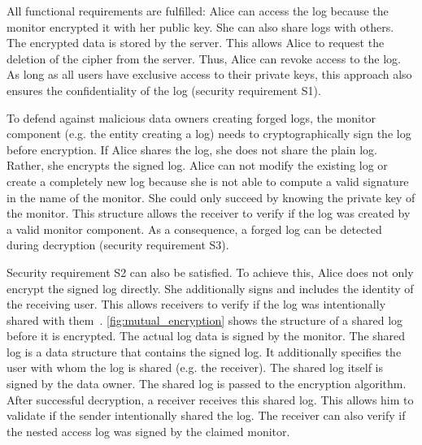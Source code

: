 \documentclass[../main.tex]{subfiles}
\begin{document}
All functional requirements are fulfilled:
Alice can access the log because the monitor encrypted it with her public key.
She can also share logs with others.
The encrypted data is stored by the server.
This allows Alice to request the deletion of the cipher from the server.
Thus, Alice can revoke access to the log.
As long as all users have exclusive access to their private keys, this approach also ensures the confidentiality of the log (security requirement S1).

To defend against malicious data owners creating forged logs, the monitor component (e.g. the entity creating a log) needs to cryptographically sign the log before encryption.
If Alice shares the log, she does not share the plain log.
Rather, she encrypts the signed log.
Alice can not modify the existing log or create a completely new log because she is not able to compute a valid signature in the name of the monitor.
She could only succeed by knowing the private key of the monitor.
This structure allows the receiver to verify if the log was created by a valid monitor component.
As a consequence, a forged log can be detected during decryption (security requirement S3).

Security requirement S2 can also be satisfied.
To achieve this, Alice does not only encrypt the signed log directly.
She additionally signs and includes the identity of the receiving user.
This allows receivers to verify if the log was intentionally shared with them~\cite{Davis2001}.
\cref{fig:mutual_encryption} shows the structure of a shared log before it is encrypted.
The actual log data is signed by the monitor.
The shared log is a data structure that contains the signed log.
It additionally specifies the user with whom the log is shared (e.g. the receiver).
The shared log itself is signed by the data owner.
The shared log is passed to the encryption algorithm.
After successful decryption, a receiver receives this shared log.
This allows him to validate if the sender intentionally shared the log.
The receiver can also verify if the nested access log was signed by the claimed monitor.
\end{document}
